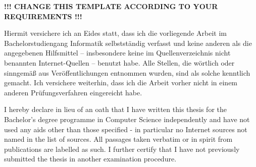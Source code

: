 %
\color{red}
\begin{center}
\bf !!! CHANGE THIS TEMPLATE ACCORDING TO YOUR REQUIREMENTS !!!
\end{center}
%
\par\noindent Hiermit versichere ich an Eides statt, dass ich die vorliegende Arbeit im Bachelorstudiengang Informatik selbstständig verfasst und keine anderen als die angegebenen Hilfsmittel – insbesondere keine im Quellenverzeichnis nicht benannten Internet-Quellen – benutzt habe.
Alle Stellen, die wörtlich oder sinngemäß aus Veröffentlichungen entnommen wurden, sind als solche kenntlich gemacht.
Ich versichere weiterhin, dass ich die Arbeit vorher nicht in einem anderen Prüfungsverfahren eingereicht habe.
%
\vspace*{2em}%
%
\par\noindent I hereby declare in lieu of an oath that I have written this thesis for the Bachelor's degree programme in Computer Science independently and have not used any aids other than those specified - in particular no Internet sources not named in the list of sources.
All passages taken verbatim or in spirit from publications are labelled as such.
I further certify that I have not previously submitted the thesis in another examination procedure.

